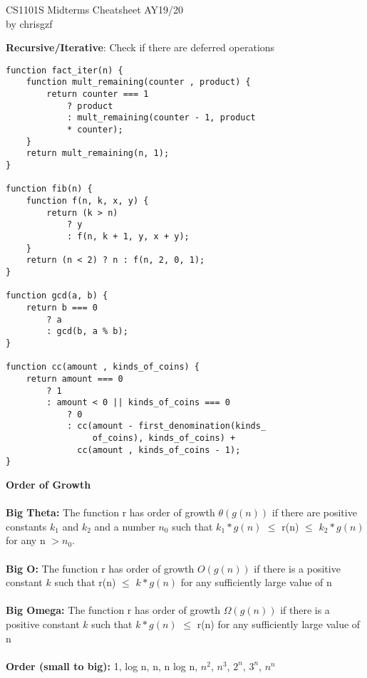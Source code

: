 \documentclass[a4paper]{article} \usepackage[backend=biber, style=numeric, sorting=none]{biblatex}
\begin{document}
\setlength\parindent{0pt} %
\scriptsize
{}

\begin{center}
{\large CS1101S Midterms Cheatsheet AY19/20}\\{by chrisgzf}
\end{center}
    \begin{multicols*}{4}

{\small\textbf{Recursive/Iterative}}: Check if there are deferred operations

\begin{verbatim}
function fact_iter(n) {
    function mult_remaining(counter , product) {
        return counter === 1
            ? product
            : mult_remaining(counter - 1, product
            * counter);
    }
    return mult_remaining(n, 1);
}

function fib(n) {
    function f(n, k, x, y) {
        return (k > n)
            ? y
            : f(n, k + 1, y, x + y);
    }
    return (n < 2) ? n : f(n, 2, 0, 1);
}

function gcd(a, b) {
    return b === 0
        ? a
        : gcd(b, a % b);
}

function cc(amount , kinds_of_coins) {
    return amount === 0
        ? 1
        : amount < 0 || kinds_of_coins === 0
            ? 0
            : cc(amount - first_denomination(kinds_
                 of_coins), kinds_of_coins) +
              cc(amount , kinds_of_coins - 1);
}
\end{verbatim}

{\small\textbf{Order of Growth}}
\\ \\
\textbf{Big Theta:} The function r has order of growth $\theta(g(n))$ if there are positive constants $k_{1}$ and $k_{2}$ and a number $n_{0}$ such that $k_{1}*g(n)$ $\leq$ r(n) $\leq$ $k_{2}*g(n)$ for any n $> n_{0}$.
\\ \\
\textbf{Big O:} The function r has order of growth $O(g(n))$ if there is a positive constant $k$ such that r(n) $\leq$ $k*g(n)$ for any sufficiently large value of n
\\ \\
\textbf{Big Omega:} The function r has order of growth $\Omega(g(n))$ if there is a positive constant $k$ such that $k*g(n)$ $\leq$ r(n) for any sufficiently large value of n
\\ \\
\textbf{Order (small to big):} 1, log n, n, n log n, $n^{2}$, $n^{3}$, $2^{n}$, $3^{n}$, $n^{n}$ \\


\end{multicols*}
\end{document}
